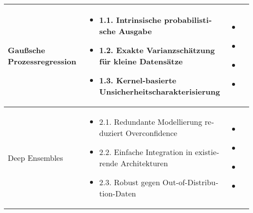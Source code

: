 \begin{otherlanguage}{ngerman}
\begin{table}[!htpb]
\begin{tabularx}{\textwidth}{|l|X|X|}
    \multirow{7}{*}{\gls{Gaußsche Prozessregression}} &
    \begin{itemize}[topsep=0em, itemsep=0em, leftmargin=*, label={}]
      \item 1.1. Intrinsische probabilistische Ausgabe
      \item 1.2. Exakte Varianzschätzung für kleine Datensätze
      \item 1.3. Kernel-basierte Unsicherheitscharakterisierung
    \end{itemize}
    &
    \begin{itemize}[topsep=0em, itemsep=0em, leftmargin=*, label={}]
      \item \parencite[Kap.~2]{rasmussen2006gaussian}
      \item \parencite[S.~16–17]{rasmussen2006gaussian}
      \item \parencite[Kap.~2.2]{rasmussen2006gaussian}
      \item \parencite[Kap.~4]{rasmussen2006gaussian}
    \end{itemize}
    \\ \hline

    \multirow{7}{*}{Deep Ensembles} &
    \begin{itemize}[topsep=0em, itemsep=0em, leftmargin=*, label={}]
      \item 2.1. Redundante Modellierung reduziert Overconfidence
      \item 2.2. Einfache Integration in existierende Architekturen
      \item 2.3. Robust gegen Out-of-Distribution-Daten
    \end{itemize}
    &
    \begin{itemize}[topsep=0em, itemsep=0em, leftmargin=*, label={}]
      \item \parencite{lakshminarayanan2017simple}
      \item \parencite[S.~3]{lakshminarayanan2017simple}
      \item \parencite[S.~5]{lakshminarayanan2017simple}
      \item \parencite{ovadia2019can}
    \end{itemize}
    \\ \hline


\end{tabularx}
\end{table}
\end{otherlanguage}
